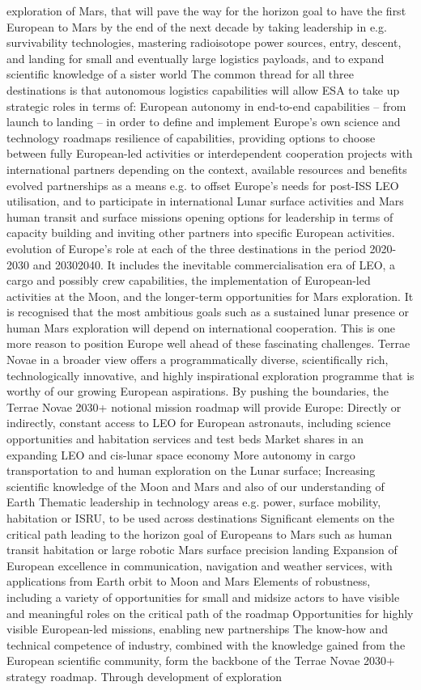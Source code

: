 \documentclass[12pt]{article}
\begin{document}
exploration of Mars, that will pave the way for the horizon goal to have the first European to Mars by the end of the next decade by taking leadership in e.g. survivability technologies, mastering radioisotope power sources, entry, descent, and landing for small and eventually large logistics payloads, and to expand scientific knowledge of a sister world The common thread for all three destinations is that autonomous logistics capabilities will allow ESA to take up strategic roles in terms of: European autonomy in end-to-end capabilities – from launch to landing – in order to define and implement Europe’s own science and technology roadmaps resilience of capabilities, providing options to choose between fully European-led activities or interdependent cooperation projects with international partners depending on the context, available resources and benefits evolved partnerships as a means e.g. to offset Europe’s needs for post-ISS LEO utilisation, and to participate in international Lunar surface activities and Mars human transit and surface missions opening options for leadership in terms of capacity building and inviting other partners into specific European activities. evolution of Europe’s role at each of the three destinations in the period 2020-2030 and 20302040. It includes the inevitable commercialisation era of LEO, a cargo and possibly crew capabilities, the implementation of European-led activities at the Moon, and the longer-term opportunities for Mars exploration. It is recognised that the most ambitious goals such as a sustained lunar presence or human Mars exploration will depend on international cooperation. This is one more reason to position Europe well ahead of these fascinating challenges. Terrae Novae in a broader view offers a programmatically diverse, scientifically rich, technologically innovative, and highly inspirational exploration programme that is worthy of our growing European aspirations. By pushing the boundaries, the Terrae Novae 2030+ notional mission roadmap will provide Europe: Directly or indirectly, constant access to LEO for European astronauts, including science opportunities and habitation services and test beds Market shares in an expanding LEO and cis-lunar space economy More autonomy in cargo transportation to and human exploration on the Lunar surface; Increasing scientific knowledge of the Moon and Mars and also of our understanding of Earth Thematic leadership in technology areas e.g. power, surface mobility, habitation or ISRU, to be used across destinations Significant elements on the critical path leading to the horizon goal of Europeans to Mars such as human transit habitation or large robotic Mars surface precision landing Expansion of European excellence in communication, navigation and weather services, with applications from Earth orbit to Moon and Mars Elements of robustness, including a variety of opportunities for small and midsize actors to have visible and meaningful roles on the critical path of the roadmap Opportunities for highly visible European-led missions, enabling new partnerships The know-how and technical competence of industry, combined with the knowledge gained from the European scientific community, form the backbone of the Terrae Novae 2030+ strategy roadmap. Through development of exploration 
\end{document}
